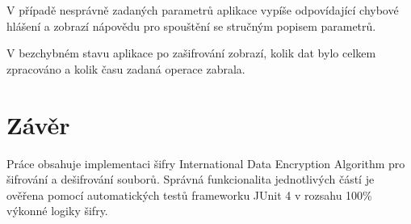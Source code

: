 \documentclass[12pt,a4paper]{article}
\let\oldsection\section
\renewcommand\section{\clearpage\oldsection}
\begin{document}
V případě nesprávně zadaných parametrů aplikace vypíše odpovídající chybové hlášení a zobrazí nápovědu pro spouštění se stručným popisem parametrů.

V bezchybném stavu aplikace po zašifrování zobrazí, kolik dat bylo celkem zpracováno a kolik času zadaná operace zabrala.

\section{Závěr}
Práce obsahuje implementaci šifry International Data Encryption Algorithm pro šifrování a dešifrování souborů. Správná funkcionalita jednotlivých částí je ověřena pomocí automatických testů frameworku JUnit 4 v rozsahu 100\% výkonné logiky šifry.

{\raggedright\small
	
}

\end{document}
